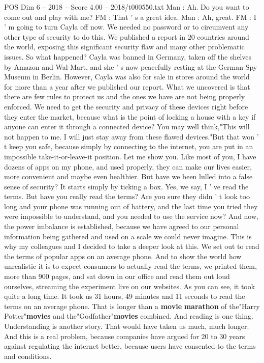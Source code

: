 \begin{textsample}{POS Dim 6 – 2018 – Score 4.00 – 2018/t000550.txt}
Man : Ah.
Do you want to come out and play with me?
FM : That ' s a great idea.
Man : Ah, great.
FM : I ' m going to turn Cayla off now.
We needed no password or to circumvent any other type of security to do this.
We published a report in 20 countries around the world, exposing this significant security flaw and many other problematic issues.
So what happened?
Cayla was banned in Germany, taken off the shelves by Amazon and Wal-Mart, and she ' s now peacefully resting at the German Spy Museum in Berlin.
However, Cayla was also for sale in stores around the world for more than a year after we published our report.
What we uncovered is that there are few rules to protect us and the ones we have are not being properly enforced.
We need to get the security and privacy of these devices right before they enter the market, because what is the point of locking a house with a key if anyone can enter it through a connected device?
You may well think,"This will not happen to me.
I will just stay away from these flawed devices."But that won ' t keep you safe, because simply by connecting to the internet, you are put in an impossible take-it-or-leave-it position.
Let me show you.
Like most of you, I have dozens of apps on my phone, and used properly, they can make our lives easier, more convenient and maybe even healthier.
But have we been lulled into a false sense of security?
It starts simply by ticking a box.
Yes, we say, I ' ve read the terms.
But have you really read the terms?
Are you sure they didn ' t look too long and your phone was running out of battery, and the last time you tried they were impossible to understand, and you needed to use the service now?
And now, the power imbalance is established, because we have agreed to our personal information being gathered and used on a scale we could never imagine.
This is why my colleagues and I decided to take a deeper look at this.
We set out to read the terms of popular apps on an average phone.
And to show the world how unrealistic it is to expect consumers to actually read the terms, we printed them, more than 900 pages, and sat down in our office and read them out loud ourselves, streaming the experiment live on our websites.
As you can see, it took quite a long time.
It took us 31 hours, 49 minutes and 11 seconds to read the terms on an average phone.
That is longer than a \textbf{movie} \textbf{marathon} of the"Harry Potter"\textbf{movies} and the"Godfather"\textbf{movies} combined.
And reading is one thing.
Understanding is another story.
That would have taken us much, much longer.
And this is a real problem, because companies have argued for 20 to 30 years against regulating the internet better, because users have consented to the terms and conditions.

\end{textsample}
